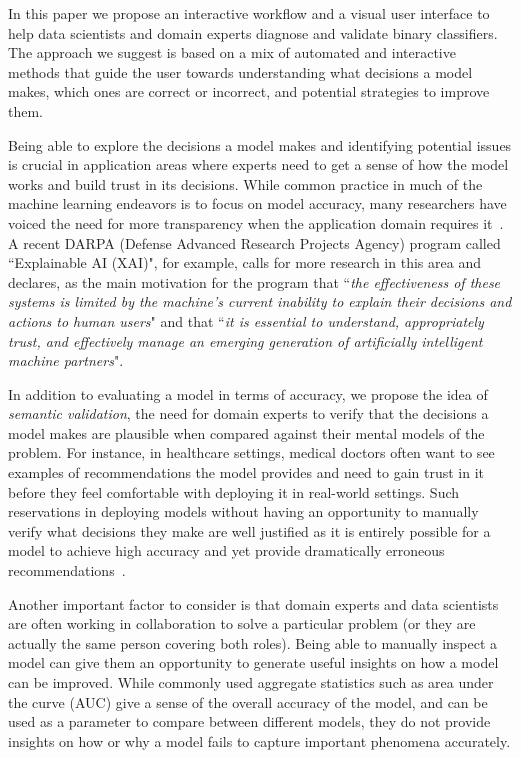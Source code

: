 In this paper we propose an interactive workflow and a visual user interface to help data scientists and domain experts diagnose and validate binary classifiers. The approach we suggest is based on a mix of automated and interactive methods that guide the user towards understanding what decisions a model makes, which ones are correct or incorrect, and potential strategies to improve them.

Being able to explore the decisions a model makes and identifying potential issues is crucial in application areas where experts need to get a sense of how the model works and build trust in its decisions. While common practice in much of the machine learning endeavors is to focus on model accuracy, many researchers have voiced the need for more transparency when the application domain requires it~\cite{baesens2003using, Caruana:2015:IMH:2783258.2788613, freitas2014comprehensible, lou2012intelligible, martens2007comprehensible, vellido2012making}. A recent DARPA (Defense Advanced Research Projects Agency) program called ``Explainable AI (XAI)", for example, calls for more research in this area and declares, as the main motivation for the program that ``\textit{the effectiveness of these systems is limited by the machine’s current inability to explain their decisions and actions to human users}" and that ``\textit{it is essential to understand, appropriately trust, and effectively manage an emerging generation of artificially intelligent machine partners}".

In addition to evaluating a model in terms of accuracy, we propose the idea of \textit{semantic validation}, the need for domain experts to verify that the decisions a model makes are plausible when compared against their mental models of the problem. For instance, in healthcare settings, medical doctors often want to see examples of recommendations the model provides and need to gain trust in it before they feel comfortable with deploying it in real-world settings.
Such reservations in deploying models without having an opportunity to manually verify what decisions they make are well justified as it is entirely possible for a model to achieve high accuracy and yet provide dramatically erroneous recommendations~\cite{Caruana:2015:IMH:2783258.2788613}.

Another important factor to consider is that domain experts and data scientists are often working in collaboration to solve a particular problem (or they are actually the same person covering both roles). Being able to manually inspect a model can give them an opportunity to generate useful insights on how a model can be improved. While commonly used aggregate statistics such as area under the curve (AUC) give a sense of the overall accuracy of the model, and can be used as a parameter to compare between different models, they do not provide insights on how or why a model fails to capture important phenomena accurately.

